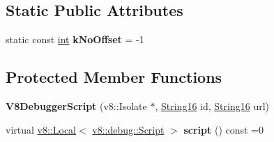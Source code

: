 \subsection*{Static Public Attributes}
\begin{DoxyCompactItemize}
\item 
\mbox{\label{classv8__inspector_1_1V8DebuggerScript_a2862b155d07c13a207c99017d789b0bf}} 
static const \mbox{\hyperlink{classint}{int}} {\bfseries k\+No\+Offset} = -\/1
\end{DoxyCompactItemize}
\subsection*{Protected Member Functions}
\begin{DoxyCompactItemize}
\item 
\mbox{\label{classv8__inspector_1_1V8DebuggerScript_a558ca1611c6eae6b36d263346813eb94}} 
{\bfseries V8\+Debugger\+Script} (v8\+::\+Isolate $\ast$, \mbox{\hyperlink{classv8__inspector_1_1String16}{String16}} id, \mbox{\hyperlink{classv8__inspector_1_1String16}{String16}} url)
\item 
\mbox{\label{classv8__inspector_1_1V8DebuggerScript_ab8131542efa716d26b348392d4d62b1b}} 
virtual \mbox{\hyperlink{classv8_1_1Local}{v8\+::\+Local}}$<$ \mbox{\hyperlink{classv8_1_1debug_1_1Script}{v8\+::debug\+::\+Script}} $>$ {\bfseries script} () const =0
\end{DoxyCompactItemize}
